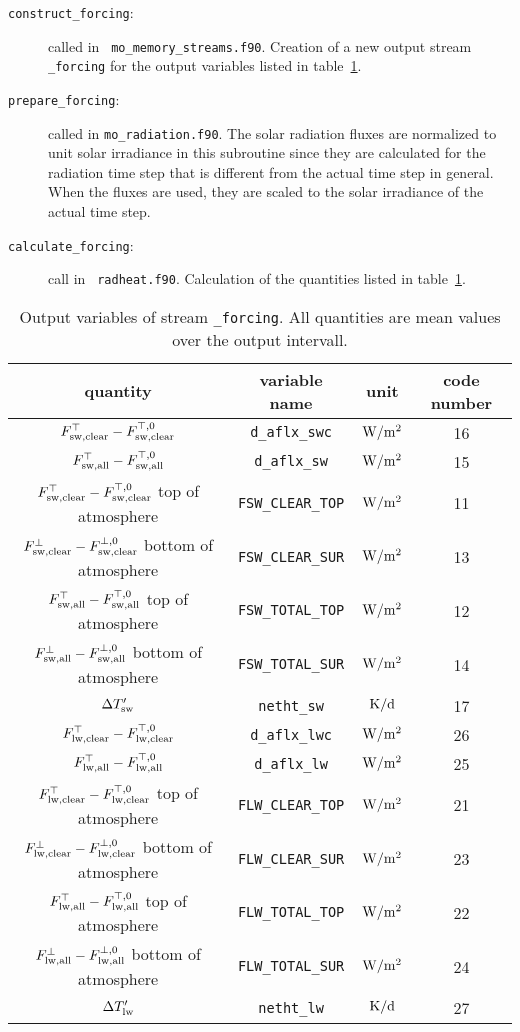 \begin{appendix}
\begin{description}
\item[{\tt construct\_forcing}:] called in {\tt
    mo\_memory\_streams.f90}. Creation of a new
  output stream {\tt \_forcing} for the output variables listed in
  table~\ref{taboutput}.  
\item[{\tt prepare\_forcing}:] called in {\tt mo\_radiation.f90}. 
  The solar radiation fluxes are
  normalized to unit solar irradiance in this subroutine since they
  are calculated for the radiation time step that is different from
  the actual \echam{} time step in general. When the fluxes are used, they
  are scaled to the solar irradiance of the actual time step.
\item[{\tt calculate\_forcing}:] call in {\tt
  radheat.f90}. Calculation of the quantities listed in
  table~\ref{taboutput}. 
\end{description}

\begin{table}[ht]
\caption{Output variables of stream {\tt \_forcing}. All quantities
  are mean values over the output intervall.}\label{taboutput}
\renewcommand{\arraystretch}{1.5}
\begin{tabular*}{\textwidth}{c@{\extracolsep\fill}ccc}\hline
quantity & variable name & unit & code number\\\hline
$F^{\top}_{\rm sw, clear}-F^{\top,0}_{\rm sw, clear}$ & {\tt d\_aflx\_swc} & $\rm W/m^2$&16\\
$F^{\top}_{\rm sw, all}-F^{\top,0}_{\rm sw, all}$ & {\tt d\_aflx\_sw} & $\rm W/m^2$ &15\\
$F^{\top}_{\rm sw, clear}-F^{\top,0}_{\rm sw, clear}$ top of atmosphere & {\tt FSW\_CLEAR\_TOP} & $\rm
W/m^2$ & 11\\
$F^{\bot}_{\rm sw, clear}-F^{\bot,0}_{\rm sw, clear}$ bottom of atmosphere & {\tt FSW\_CLEAR\_SUR} &$\rm
W/m^2$&13\\
$F^{\top}_{\rm sw, all}-F^{\top,0}_{\rm sw, all}$ top of atmosphere & {\tt FSW\_TOTAL\_TOP} & $\rm W/m^2$&12\\
$F^{\bot}_{\rm sw, all}-F^{\bot,0}_{\rm sw, all}$ bottom of atmosphere & {\tt FSW\_TOTAL\_SUR} & $\rm W/m^2$&14\\
$\Delta T'_{\rm sw}$ & {\tt netht\_sw} & $\rm K/d$&17 \\
$F^{\top}_{\rm lw, clear}-F^{\top,0}_{\rm lw, clear}$ & {\tt d\_aflx\_lwc} & $\rm W/m^2$&26\\
$F^{\top}_{\rm lw, all}-F^{\top,0}_{\rm lw, all}$ & {\tt d\_aflx\_lw} & $\rm W/m^2$&25 \\
$F^{\top}_{\rm lw, clear}-F^{\top,0}_{\rm lw, clear}$ top of atmosphere & {\tt FLW\_CLEAR\_TOP} & $\rm W/m^2$&21 \\
$F^{\bot}_{\rm lw, clear}-F^{\bot,0}_{\rm lw, clear}$ bottom of atmosphere & {\tt FLW\_CLEAR\_SUR} &$\rm W/m^2$&23\\
$F^{\top}_{\rm lw, all}-F^{\top,0}_{\rm lw, all}$ top of atmosphere & {\tt FLW\_TOTAL\_TOP} & $\rm W/m^2$&22 \\
$F^{\bot}_{\rm lw, all}-F^{\bot,0}_{\rm lw, all}$ bottom of atmosphere & {\tt FLW\_TOTAL\_SUR} & $\rm W/m^2$&24\\
$\Delta T'_{\rm lw}$ & {\tt netht\_lw} & $\rm K/d$&27 \\
\hline
\end{tabular*}
\end{table}


\end{appendix}
